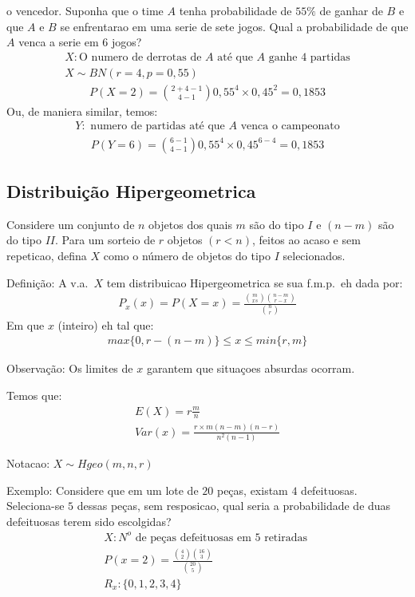 \documentclass[11pt,a4paper]{book}
\begin{document}
\begin{description}
      o vencedor. Suponha que o time $A$ tenha probabilidade de $55\%$ de ganhar de $B$ e que $A$ e $B$ 
      se enfrentarao em uma serie de sete jogos. Qual a probabilidade de que $A$ venca a serie em 6 jogos?
     \begin{align*} 
       X:\text{O numero de derrotas de $A$ até que $A$ ganhe 4 partidas}\\
       X \mathtt{\sim}BN (r=4, p=0,55)
     \end{align*}
     \begin{align*}
       P(X=2)=\binom{2+4-1}{4-1} 0,55^{4}\times 0,45^{2}=0,1853
     \end{align*}
     Ou, de maniera similar, temos:
     \begin{align*}
       Y: \text{ numero de partidas até que $A$ venca o campeonato}
     \end{align*}
     \begin{align*}
       P(Y=6)= \binom{6-1}{4-1} 0,55^{4} \times 0,45^{6-4} = 0,1853
     \end{align*}
 \end{description}
 \subsection{Distribuição Hipergeometrica}
Considere um conjunto de $n$ objetos dos quais $m$ são do tipo $I$
e $(n-m) $ são do tipo $II$. Para um sorteio de $r$ objetos $(r<n)$, 
feitos ao acaso e sem repeticao, defina $X$ como o número de objetos do tipo
$I$ selecionados.
\begin{description}
  \item{Definição}: A v.a.\ $X$ tem distribuicao Hipergeometrica se sua f.m.p.\ eh dada
    por:
    \begin{align*}
      P_x(x)= P(X=x)= \frac{\binom{m}{xs} \binom{n-m}{r-x}}{\binom{n}{r}}
    \end{align*}
    Em que $x$ (inteiro) eh tal que:
    \begin{align*}
      max \{0,r-(n-m)\} \leq x \leq min \{ r,m \}
    \end{align*}
  \item{Observação}: Os limites de $x$ garantem que situaçoes absurdas ocorram.
  \item{Temos que: }
    \begin{align*}
      E(X) = r \frac{m}{n} \\
      Var(x)= \frac{r\times m (n-m)(n-r)}{n^2 (n-1)}
    \end{align*}
  \item{Notacao}: $X \mathtt{\sim} Hgeo (m,n,r)$
  \item{Exemplo}: Considere que em um lote de $20$ peças, existam $4$ defeituosas.
    Seleciona-se $5$ dessas peças, sem resposicao, qual seria a probabilidade 
    de duas defeituosas terem sido escolgidas?
    \begin{align*}
      X: \text{$N^{o}$  de peças defeituosas em $5$ retiradas }\\
      P(x=2)=\frac{\binom{4}{2} \binom{16}{3}}{\binom{20}{5}}\\
      R_{x}: \{ 0,1,2,3,4 \}
    \end{align*}
\end{description}
\end{document}

